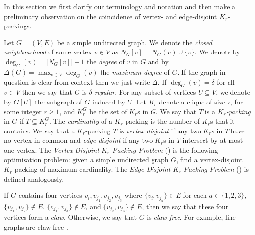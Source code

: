 In this section we first clarify our terminology and notation and then make a preliminary observation on the coincidence of vertex- and edge-disjoint $K_r$-packings.

Let $G = (V, E)$ be a simple undirected graph. We denote the \emph{closed neighbourhood} of some vertex $v \in V$ as $N_{G}[v] = N_{G}(v) \cup \{ v \}$. We denote by $\deg_{G}(v) = |N_{G}[v]| - 1$ the \emph{degree} of $v$ in $G$ and by $\Delta(G) = \max_{v\in V} \deg_{G}(v)$ the \emph{maximum degree} of $G$. If the graph in question is clear from context then we just write $\Delta$. If $\deg_{G}(v) = \delta$ for all $v \in V$ then we say that $G$ is \emph{$\delta$-regular}. For any subset of vertices $U \subseteq V$, we denote by $G[U]$ the subgraph of $G$ induced by $U$. 
Let $K_r$ denote a clique of size $r$, for some integer $r \geq 1$, and $K_r^G$ be the set of $K_r$s in $G$. We say that $T$ is a \emph{$K_r$-packing} in $G$ if $T\subseteq K_r^G$. The \emph{cardinality} of a $K_r$-packing is the number of $K_r$s that it contains. We say that a $K_r$-packing $T$ is \emph{vertex disjoint} if any two $K_r$s in $T$ have no vertex in common and \emph{edge disjoint} if any two $K_r$s in $T$ intersect by at most one vertex. The \emph{Vertex-Disjoint $K_r$-Packing Problem} () is the following optimisation problem: given a simple undirected graph $G$, find a vertex-disjoint $K_r$-packing of maximum cardinality. The \emph{Edge-Disjoint $K_r$-Packing Problem} () is defined analogously.

If $G$ contains four vertices $v_i, v_{j_1}, v_{j_2}, v_{j_3}$ where $\{ v_i, v_{j_a} \} \in E$ for each $a \in \{ 1, 2, 3 \}$, $\{ v_{j_1}, v_{j_2} \} \notin E$, $\{ v_{j_1}, v_{j_3} \} \notin E$, and $\{ v_{j_2}, v_{j_3} \} \notin E$, then we say that these four vertices form a \emph{claw}. Otherwise, we say that $G$ is \emph{claw-free}. For example, line graphs are claw-free \cite{MINTY1980284}. 

%     

